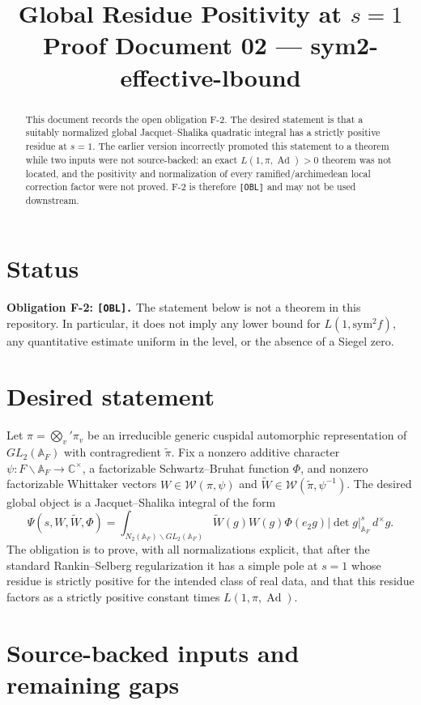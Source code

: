 \documentclass[12pt]{article}
\title{Global Residue Positivity at $s=1$\\
\large Proof Document 02 --- sym2-effective-lbound}
\author{}
\date{}
\DeclareMathOperator{\Ad}{Ad}
\newcommand{\A}{\mathbb{A}}
\newcommand{\calW}{\mathcal{W}}
\begin{document}
\maketitle

\begin{abstract}
This document records the open obligation F-2.  The desired statement is that a
suitably normalized global Jacquet--Shalika quadratic integral has a strictly
positive residue at $s=1$.  The earlier version incorrectly promoted this
statement to a theorem while two inputs were not source-backed: an exact
$L(1,\pi,\Ad)>0$ theorem was not located, and the positivity and normalization
of every ramified/archimedean local correction factor were not proved.  F-2 is
therefore \texttt{[OBL]} and may not be used downstream.
\end{abstract}

\section*{Status}

\textbf{Obligation F-2: \texttt{[OBL].}}  The statement below is not a theorem
in this repository.  In particular, it does not imply any lower bound for
$L(1,\mathrm{sym}^2 f)$, any quantitative estimate uniform in the level, or the
absence of a Siegel zero.

\section{Desired statement}

Let $\pi=\bigotimes_v'\pi_v$ be an irreducible generic cuspidal automorphic
representation of $GL_2(\A_F)$ with contragredient $\tilde\pi$.  Fix a nonzero
additive character $\psi:F\backslash\A_F\to\mathbb{C}^\times$, a factorizable
Schwartz--Bruhat function $\Phi$, and nonzero factorizable Whittaker vectors
$W\in\calW(\pi,\psi)$ and $\tilde W\in\calW(\tilde\pi,\psi^{-1})$.  The desired
global object is a Jacquet--Shalika integral of the form
\[
  \Psi(s,W,\tilde W,\Phi)
  =\int_{N_2(\A_F)\backslash GL_2(\A_F)}
    \tilde W(g)W(g)\Phi(e_2g)|\det g|_{\A_F}^{s}\,d^\times g .
\]
The obligation is to prove, with all normalizations explicit, that after the
standard Rankin--Selberg regularization it has a simple pole at $s=1$ whose
residue is strictly positive for the intended class of real data, and that this
residue factors as a strictly positive constant times $L(1,\pi,\Ad)$.

\section{Source-backed inputs and remaining gaps}
\end{document}
